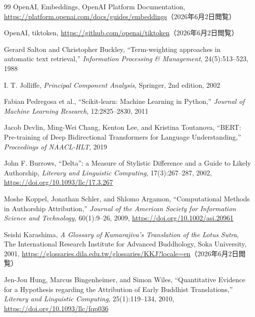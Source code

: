 \documentclass[uplatex,dvipdfmx,11pt,a4paper]{jsarticle}
\begin{document}
\begin{thebibliography}{99}
OpenAI,
\newblock Embeddings, OpenAI Platform Documentation,
\newblock \url{https://platform.openai.com/docs/guides/embeddings}（2026年6月2日閲覧）

OpenAI,
\newblock tiktoken,
\newblock \url{https://github.com/openai/tiktoken}（2026年6月2日閲覧）

Gerard Salton and Christopher Buckley,
\newblock ``Term-weighting approaches in automatic text retrieval,''
\newblock \textit{Information Processing \& Management}, 24(5):513--523, 1988

I. T. Jolliffe,
\newblock \textit{Principal Component Analysis},
\newblock Springer, 2nd edition, 2002

Fabian Pedregosa et al.,
\newblock ``Scikit-learn: Machine Learning in Python,''
\newblock \textit{Journal of Machine Learning Research}, 12:2825--2830, 2011

Jacob Devlin, Ming-Wei Chang, Kenton Lee, and Kristina Toutanova,
\newblock ``BERT: Pre-training of Deep Bidirectional Transformers for Language Understanding,''
\newblock \textit{Proceedings of NAACL-HLT}, 2019

John F. Burrows,
\newblock ``Delta'': a Measure of Stylistic Difference and a Guide to Likely Authorship,
\newblock \textit{Literary and Linguistic Computing}, 17(3):267--287, 2002,
\newblock \url{https://doi.org/10.1093/llc/17.3.267}

Moshe Koppel, Jonathan Schler, and Shlomo Argamon,
\newblock ``Computational Methods in Authorship Attribution,''
\newblock \textit{Journal of the American Society for Information Science and Technology}, 60(1):9--26, 2009,
\newblock \url{https://doi.org/10.1002/asi.20961}

Seishi Karashima,
\newblock \textit{A Glossary of Kumarajiva's Translation of the Lotus Sutra},
\newblock The International Research Institute for Advanced Buddhology, Soka University, 2001,
\newblock \url{https://glossaries.dila.edu.tw/glossaries/KKJ?locale=en}（2026年6月2日閲覧）

Jen-Jou Hung, Marcus Bingenheimer, and Simon Wiles,
\newblock ``Quantitative Evidence for a Hypothesis regarding the Attribution of Early Buddhist Translations,''
\newblock \textit{Literary and Linguistic Computing}, 25(1):119--134, 2010,
\newblock \url{https://doi.org/10.1093/llc/fqp036}


\end{thebibliography}
\end{document}
